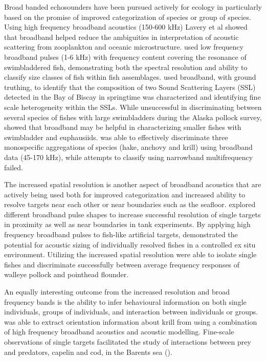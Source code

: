 \documentclass[preprint,12pt,TurnOnLineNumbers]{JASAnew}
\begin{document}
Broad banded echosounders have been pursued actively for ecology in particularly based on the promise of improved categorization of species or group of species. Using high frequency broadband acoustics (150-600 kHz) Lavery et al \citep{lavery_measurements_2010} showed that broadband helped reduce the ambiguities in interpretation of acoustic scattering from zooplankton and oceanic microstructure. \citep{Stanton2012Resonance} used low frequency broadband pulses (1-6 kHz) with frequency content covering the resonance of swimbladdered fish, demonstrating both the spectral resolution and ability to classify size classes of fish within fish assemblages. \citep{blanluet_characterization_2019} used broadband, with ground truthing, to identify that the composition of two Sound Scattering Layers (SSL) detected in the Bay of Biscay in springtime was characterized and identifying fine scale heterogeneity within the SSLs. While unsuccessful in discriminating between several species of fishes with large  swimbladders during the Alaska pollock survey, \citep{bassett_broadband_2018} showed that broadband may be helpful in characterizing smaller fishes with swimbladder and euphausiids. \citep{benoit-bird_exploring_2020} was able to effectively discriminate three monospecific aggregations of species (hake, anchovy and krill) using broadband data (45-170 kHz), while attempts to classify using narrowband multifrequency failed.

The increased spatial resolution is another aspect of broadband acoustics that are actively being used both for improved categorization and increased ability to resolve targets near each other or near boundaries such as the seafloor. \citep{lavery2017} explored different broadband pulse shapes to increase successful resolution of single targets in proximity as well as near boundaries in tank experiments. By applying high frequency broadband pulses to fish-like artificial targets, \citep{kubilius_remote_2020} demonstrated the potential for acoustic sizing of individually resolved fishes in a controlled ex situ environment. Utilizing the increased spatial resolution \citep{hasegawa_situ_2021} were able to isolate single fishes and discriminate successfully between average frequency responses of walleye pollock and pointhead flounder.

An equally interesting outcome from the increased resolution and broad frequency bands is the ability to infer behavioural information on both single individuals, groups of individuals, and interaction between individuals or groups. \citep{Traykovski1998Effect} was able to extract orientation information about krill from using a combination of high frequency broadband acoustics and acoustic modelling. Fine-scale observations of single targets facilitated the study of interactions between prey and predators, capelin and cod, in the Barents sea (\citep{skaret_diel_2020}).
\end{document}
